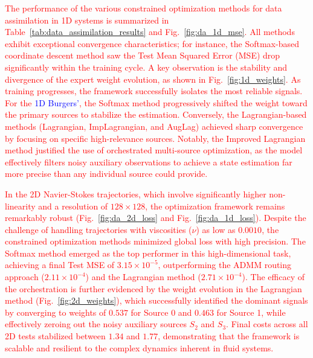 \documentclass[preprint,12pt,authoryear]{elsarticle}
\begin{document}
\textcolor{red}{The performance of the various constrained optimization methods for data assimilation in 1D systems is summarized in Table~\ref{tab:data_assimilation_results} and Fig.~\ref{fig:da_1d_mse}. All methods exhibit exceptional convergence characteristics; for instance, the Softmax-based coordinate descent method saw the Test Mean Squared Error (MSE) drop significantly within the training cycle. A key observation is the stability and divergence of the expert weight evolution, as shown in Fig.~\ref{fig:1d_weights}. As training progresses, the framework successfully isolates the most reliable signals. For the \textcolor{blue}{1D Burgers'}, the Softmax method progressively shifted the weight toward the primary sources to stabilize the estimation. Conversely, the Lagrangian-based methods (Lagrangian, ImpLagrangian, and AugLag) achieved sharp convergence by focusing on specific high-relevance sources. Notably, the Improved Lagrangian method justified the use of orchestrated multi-source optimization, as the model effectively filters noisy auxiliary observations to achieve a state estimation far more precise than any individual source could provide.}

\textcolor{red}{In the 2D Navier-Stokes trajectories, which involve significantly higher non-linearity and a resolution of $128 \times 128$, the optimization framework remains remarkably robust (Fig.~\ref{fig:da_2d_loss} and Fig.~\ref{fig:da_1d_loss}). Despite the challenge of handling trajectories with viscosities ($\nu$) as low as $0.0010$, the constrained optimization methods minimized global loss with high precision. The Softmax method emerged as the top performer in this high-dimensional task, achieving a final Test MSE of $3.15 \times 10^{-5}$, outperforming the ADMM routing approach ($2.11 \times 10^{-4}$) and the Lagrangian method ($2.71 \times 10^{-4}$). The efficacy of the orchestration is further evidenced by the weight evolution in the Lagrangian method (Fig.~\ref{fig:2d_weights}), which successfully identified the dominant signals by converging to weights of $0.537$ for Source 0 and $0.463$ for Source 1, while effectively zeroing out the noisy auxiliary sources $S_2$ and $S_3$. Final costs across all 2D tests stabilized between $1.34$ and $1.77$, demonstrating that the framework is scalable and resilient to the complex dynamics inherent in fluid systems.}
\end{document}
